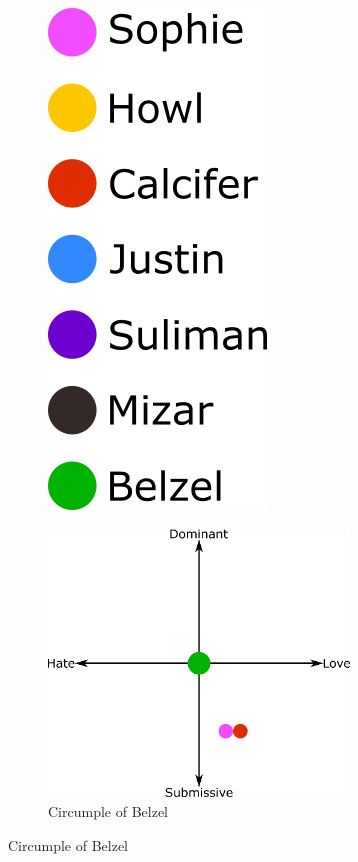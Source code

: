 \begin{figure}
\centering
\begin{subfigure}
  \centering
  \includegraphics[scale=0.3]{Images/charactersColors}
\end{subfigure}
\begin{subfigure}
  \centering
  \includegraphics[width=8cm]{Images/Circumplexes/belzelCircumplex}
  \caption{Circumple of Belzel}
\end{subfigure}
\end{figure}

